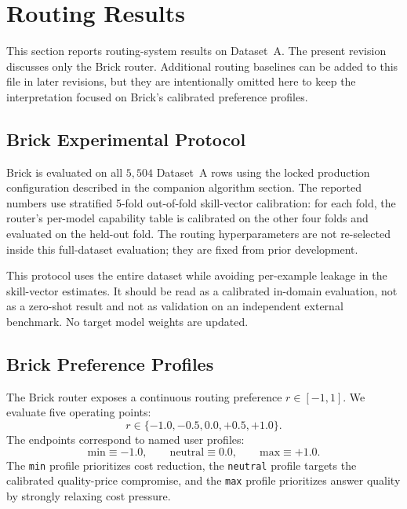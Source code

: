 
\section{Routing Results}
\label{sec:routing-results}

This section reports routing-system results on Dataset~A. The present revision
discusses only the Brick router. Additional routing baselines can be added to
this file in later revisions, but they are intentionally omitted here to keep
the interpretation focused on Brick's calibrated preference profiles.

\subsection{Brick Experimental Protocol}
\label{sec:routers-brick-protocol}

Brick is evaluated on all \(5{,}504\) Dataset~A rows using the locked production
configuration described in the companion algorithm section. The reported
numbers use stratified 5-fold out-of-fold skill-vector calibration:
for each fold, the router's per-model capability table is calibrated on the
other four folds and evaluated on the held-out fold. The routing hyperparameters
are not re-selected inside this full-dataset evaluation; they are fixed from
prior development.

This protocol uses the entire dataset while avoiding per-example leakage in the
skill-vector estimates. It should be read as a calibrated in-domain evaluation,
not as a zero-shot result and not as validation on an independent external
benchmark. No target model weights are updated.

\subsection{Brick Preference Profiles}
\label{sec:routers-brick-profiles}

The Brick router exposes a continuous routing preference \(r\in[-1,1]\). We
evaluate five operating points:
\[
  r\in\{-1.0,-0.5,0.0,+0.5,+1.0\}.
\]
The endpoints correspond to named user profiles:
\[
  \mathrm{min}\equiv -1.0,\qquad
  \mathrm{neutral}\equiv 0.0,\qquad
  \mathrm{max}\equiv +1.0.
\]
The \texttt{min} profile prioritizes cost reduction, the \texttt{neutral}
profile targets the calibrated quality-price compromise, and the \texttt{max}
profile prioritizes answer quality by strongly relaxing cost pressure.


